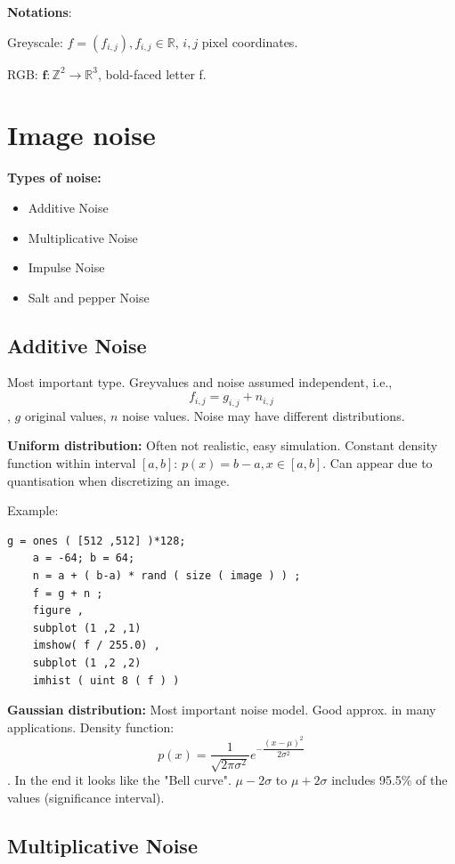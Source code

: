 \textbf{Notations}:

Greyscale: $f = (f_{i,j}), f_{i,j} \in \mathbb{R}$, $i,j$ pixel coordinates.

RGB: $\textbf{f} : \mathbb{Z}^2 \rightarrow \mathbb{R}^3$, bold-faced letter f.

\section{Image noise}

\textbf{Types of noise:}

\begin{itemize}
    \item Additive Noise
    \item Multiplicative Noise
    \item Impulse Noise
    \item Salt and pepper Noise
\end{itemize}

\subsection{Additive Noise}
Most important type. Greyvalues and noise assumed independent, i.e., $$f_{i,j} = g_{i,j}+n_{i,j}$$, $g$ original values, $n$ noise values. Noise may have different distributions.

\textbf{Uniform distribution:} Often not realistic, easy simulation. Constant density function within interval $[a,b]$: $p(x) = b-a, x \in [a,b]$. Can appear due to quantisation when discretizing an image.

Example: \begin{verbatim}
g = ones ( [512 ,512] )*128;
	a = -64; b = 64;
	n = a + ( b-a) * rand ( size ( image ) ) ;
	f = g + n ;
	figure ,
	subplot (1 ,2 ,1)
	imshow( f / 255.0) ,
	subplot (1 ,2 ,2)
	imhist ( uint 8 ( f ) )
\end{verbatim}

\textbf{Gaussian distribution:} Most important noise model. Good approx. in many applications. Density function: $$p(x) = \dfrac{1}{\sqrt{2\pi \sigma^2}} e^{-\dfrac{(x - \mu)^2}{2\sigma^2}}$$. In the end it looks like the "Bell curve". $\mu - 2\sigma$ to $\mu + 2\sigma$ includes 95.5\% of the values (significance interval).

\subsection{Multiplicative Noise}


